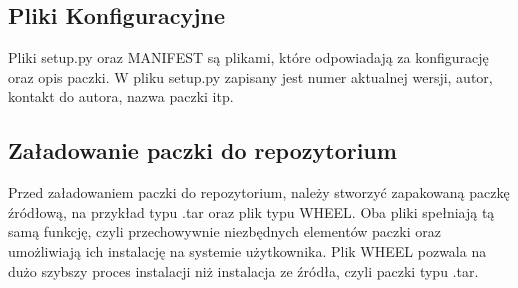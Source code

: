    \subsection{Pliki Konfiguracyjne}
    \quad Pliki setup.py oraz MANIFEST są plikami, które odpowiadają za konfigurację oraz opis paczki. W pliku setup.py zapisany jest numer aktualnej wersji, autor, kontakt do autora, nazwa paczki itp. 
    
    \quad 
    
    
    \subsection{Załadowanie paczki do repozytorium}
    
    \quad Przed załadowaniem paczki do repozytorium, należy stworzyć zapakowaną paczkę źródłową, na przykład typu .tar oraz plik typu WHEEL. Oba pliki spełniają tą samą funkcję, czyli przechowywnie niezbędnych elementów paczki oraz umożliwiają ich instalację na systemie użytkownika. Plik WHEEL pozwala na dużo szybszy proces instalacji niż instalacja ze źródła, czyli paczki typu .tar. 
